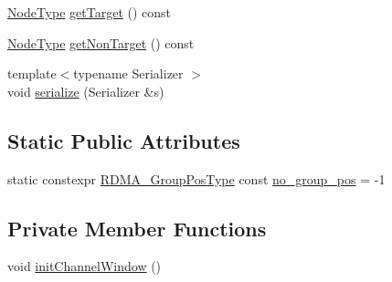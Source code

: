 \begin{DoxyCompactItemize}
\item 
\hyperlink{namespacevt_a866da9d0efc19c0a1ce79e9e492f47e2}{Node\+Type} \hyperlink{structvt_1_1rdma_1_1_channel_a2185f0c194fd626b0e617c8e706bf297}{get\+Target} () const
\item 
\hyperlink{namespacevt_a866da9d0efc19c0a1ce79e9e492f47e2}{Node\+Type} \hyperlink{structvt_1_1rdma_1_1_channel_ada79ff7c9444bae5dea0382e277f6b7d}{get\+Non\+Target} () const
\item 
{\footnotesize template$<$typename Serializer $>$ }\\void \hyperlink{structvt_1_1rdma_1_1_channel_af45db7f8bebc38bb237a80adaaefed38}{serialize} (Serializer \&s)
\end{DoxyCompactItemize}
\subsection*{Static Public Attributes}
\begin{DoxyCompactItemize}
\item 
static constexpr \hyperlink{structvt_1_1rdma_1_1_channel_ae67759ab26cc035489edd369ae207cfc}{R\+D\+M\+A\+\_\+\+Group\+Pos\+Type} const \hyperlink{structvt_1_1rdma_1_1_channel_a5b8e4d79d272951f51a9856705110d24}{no\+\_\+group\+\_\+pos} = -\/1
\end{DoxyCompactItemize}
\subsection*{Private Member Functions}
\begin{DoxyCompactItemize}
\item 
void \hyperlink{structvt_1_1rdma_1_1_channel_a3712a0de4b68dc7cc2c8da2d040d732b}{init\+Channel\+Window} ()
\end{DoxyCompactItemize}

